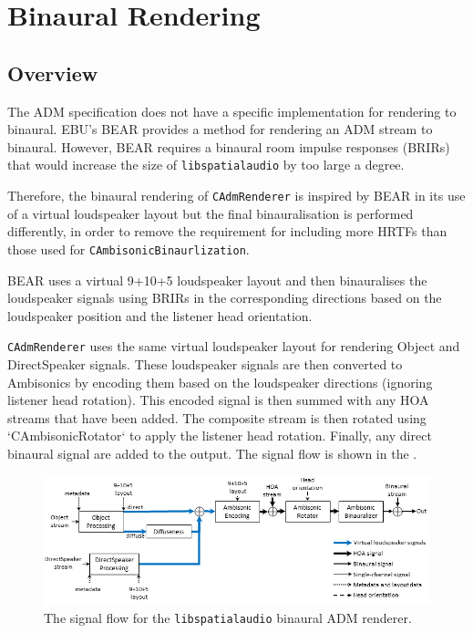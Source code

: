 \documentclass[12pt]{report}
\def\libspataud{\texttt{libspatialaudio}\xspace}
\newcommand{\code}[1]{\texttt{#1}}
\begin{document}
\section{Binaural Rendering}\label{AdmBinaural}

\subsection{Overview}

The ADM specification does not have a specific implementation for rendering to binaural. EBU's BEAR \cite{EBU3369} provides a method for rendering an ADM stream to binaural.
However, BEAR requires a  binaural room impulse responses (BRIRs) that would increase the size of \libspataud by too large a degree.

Therefore, the binaural rendering of \code{CAdmRenderer} is inspired by BEAR in its use of a virtual loudspeaker layout but the final binauralisation is performed differently, in order to remove the requirement for including more HRTFs than those used for \code{CAmbisonicBinaurlization}.

BEAR uses a virtual 9+10+5 loudspeaker layout and then binauralises the loudspeaker signals using BRIRs in the corresponding directions based on the loudspeaker position and the listener head orientation.

\code{CAdmRenderer} uses the same virtual loudspeaker layout for rendering Object and DirectSpeaker signals.
These loudspeaker signals are then converted to Ambisonics by encoding them based on the loudspeaker directions (ignoring listener head rotation).
This encoded signal is then summed with any HOA streams that have been added.
The composite stream is then rotated using `CAmbisonicRotator` to apply the listener head rotation.
Finally, any direct binaural signal are added to the output.
The signal flow is shown in the \cite{fig:adm_binaral}.

\begin{figure}
    \centering
    \includegraphics[width = \textwidth]{figures/AdmBinauralSignalFlow.png}
    \caption{The signal flow for the \libspataud binaural ADM renderer.}
    \label{fig:adm_binaural}
\end{figure}
\end{document}
